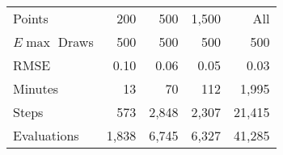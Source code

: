 \documentclass{beamer} %
\begin{document}
\begin{frame}[noframenumbering]\begin{center}
\begin{table}
\begin{center}
\begin{threeparttable}
  \begin{tabular}{lrrrr}\toprule
  Points      & 200 & 500 & 1,500  & All \\
  $E\max$ Draws & 500 &  500 &   500 & 500 \\
  \midrule
  RMSE        & 0.10 &   0.06 &    0.05 &  0.03  \\
  Minutes     &  13 &      70 &    112 &   1,995 \\
  Steps       &  573 &   2,848 &    2,307 &  21,415 \\
  Evaluations & 1,838 &   6,745 &    6,327 &  41,285 \\
  \bottomrule
  \end{tabular}
  \end{threeparttable}
  \end{center}
\end{table}
\end{center}\end{frame}
\end{document}
